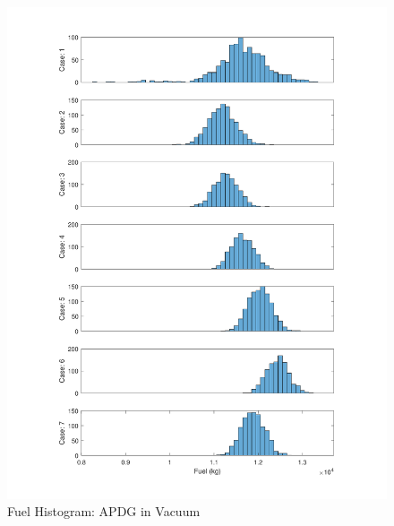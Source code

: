 \begin{figure}[H]
	\centering
	\begin{minipage}{4.3 in}
		\includegraphics[width=\linewidth]{Figures/hfueldisppowvac.pdf}
		\caption{Fuel Histogram: APDG in Vacuum \label{fig:hfueldisppowvac} }
	\end{minipage}
\end{figure}

